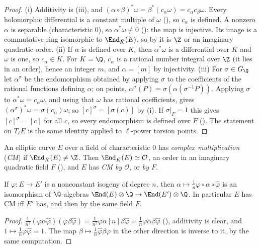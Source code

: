 \begin{proof}
(i) Additivity is (iii), and $(\alpha\circ\beta)^*\omega=\beta^*(c_\alpha\omega)=c_\alpha c_\beta\omega$. Every holomorphic differential is a constant multiple of
$\omega$ (), so $c_\alpha$ is defined. A nonzero $\alpha$ is separable (characteristic $0$), so $\alpha^*\omega\ne0$ (): the map is injective. Its
image is a commutative ring isomorphic to $\End_{\bar K}(E)$, so by  it is $\Z$ or an imaginary quadratic order.
(ii) If $\alpha$ is defined over $K$, then $\alpha^*\omega$ is a differential over $K$ and $\omega$ is one, so $c_\alpha\in K$. For $K=\Q$, $c_\alpha$ is a rational number integral over $\Z$
(it lies in an order), hence an integer $m$, and $\alpha=[m]$ by injectivity.
(iii) For $\sigma\in G_\Q$ let $\alpha^\sigma$ be the endomorphism obtained by applying $\sigma$ to the coefficients of the rational functions defining $\alpha$; on points,
$\alpha^\sigma(P)=\sigma(\alpha(\sigma^{-1}P))$. Applying $\sigma$ to $\alpha^*\omega=c_\alpha\omega$, and using that $\omega$ has rational coefficients, gives
$(\alpha^\sigma)^*\omega=\sigma(c_\alpha)\omega$; so $[c]^\sigma=[\sigma(c)]$ by (i). If $\sigma|_F=1$ this gives $[c]^\sigma=[c]$ for all $c$, so every endomorphism is defined over
$F$ (). The statement on $T_\ell E$ is the same identity applied to $\ell$-power torsion points.
\end{proof}

\begin{definition}\label{def:ellcurves:cm}
An elliptic curve $E$ over a field of characteristic $0$ has \emph{complex multiplication} (\emph{CM}) if $\End_{\bar K}(E)\ne\Z$. Then
$\End_{\bar K}(E)\simeq\mathcal O$, an order in an imaginary quadratic field $F$ (), and $E$ has \emph{CM by $\mathcal O$}, or \emph{by $F$}.
\end{definition}

\begin{lemma}\label{lem:ellcurves:cm-isog}
If $\varphi\colon E\to E'$ is a nonconstant isogeny of degree $n$, then $\alpha\mapsto\frac1n\varphi\circ\alpha\circ\hat\varphi$ is an isomorphism of $\Q$-algebras
$\End(E)\otimes\Q\to\End(E')\otimes\Q$. In particular $E$ has CM iff $E'$ has, and then by the same field $F$.
\end{lemma}

\begin{proof}
$\frac1{n^2}(\varphi\alpha\hat\varphi)(\varphi\beta\hat\varphi)=\frac1{n^2}\varphi\alpha[n]\beta\hat\varphi=\frac1n\varphi\alpha\beta\hat\varphi$ (), additivity is clear, and $1\mapsto\frac1n\varphi\hat\varphi=1$. The map
$\beta\mapsto\frac1n\hat\varphi\beta\varphi$ in the other direction is inverse to it, by the same computation.
\end{proof}

